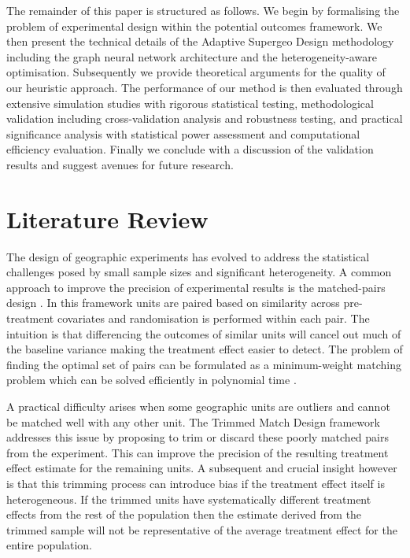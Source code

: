 \documentclass[final,3p,fleqn, 10pt]{elsarticle}
\begin{document}
The remainder of this paper is structured as follows. We begin by formalising the problem of experimental design within the potential outcomes framework. We then present the technical details of the Adaptive Supergeo Design methodology including the graph neural network architecture and the heterogeneity-aware optimisation. Subsequently we provide theoretical arguments for the quality of our heuristic approach. The performance of our method is then evaluated through extensive simulation studies with rigorous statistical testing, methodological validation including cross-validation analysis and robustness testing, and practical significance analysis with statistical power assessment and computational efficiency evaluation. Finally we conclude with a discussion of the validation results and suggest avenues for future research.

\section{Literature Review}
\label{sec:literature}
The design of geographic experiments has evolved to address the statistical challenges posed by small sample sizes and significant heterogeneity. A common approach to improve the precision of experimental results is the matched-pairs design \citep{imbens2015causal}. In this framework units are paired based on similarity across pre-treatment covariates and randomisation is performed within each pair. The intuition is that differencing the outcomes of similar units will cancel out much of the baseline variance making the treatment effect easier to detect. The problem of finding the optimal set of pairs can be formulated as a minimum-weight matching problem which can be solved efficiently in polynomial time \citep{edmonds1965maximum, rosenbaum2020design}.

A practical difficulty arises when some geographic units are outliers and cannot be matched well with any other unit. The Trimmed Match Design framework \citep{chen2021} addresses this issue by proposing to trim or discard these poorly matched pairs from the experiment. This can improve the precision of the resulting treatment effect estimate for the remaining units. A subsequent and crucial insight however is that this trimming process can introduce bias if the treatment effect itself is heterogeneous. If the trimmed units have systematically different treatment effects from the rest of the population then the estimate derived from the trimmed sample will not be representative of the average treatment effect for the entire population.
\end{document}
